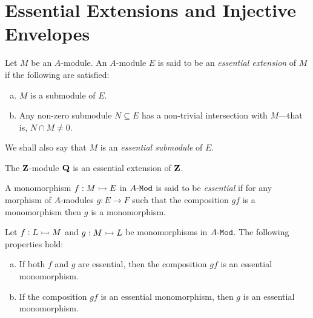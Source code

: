 \section{Essential Extensions and Injective Envelopes}

\begin{definition}
\label{def:essential-extension}
Let \(M\) be an \(A\)-module. An \(A\)-module \(E\) is said to be an
\emph{essential extension} of \(M\) if the following are satisfied:
\begin{enumerate}[(a)]\setlength\itemsep{0em}
\item \(M\) is a submodule of \(E\).
\item Any non-zero submodule \(N \subseteq E\) has a non-trivial intersection with
  \(M\)---that is, \(N \cap M \neq 0\).
\end{enumerate}
We shall also say that \(M\) is an \emph{essential submodule} of \(E\).
\end{definition}

\begin{example}
\label{exp:Q-is-essential-extension-of-Z}
The \(\mathbf{Z}\)-module \(\mathbf{Q}\) is an essential extension of \(\mathbf{Z}\).
\end{example}

\begin{definition}
\label{def:essential-monomorphism}
A monomorphism \(f: M \rightarrowtail E\) in \({A\text{-}\texttt{Mod}}\) is said to be \emph{essential} if
for any morphism of \(A\)-modules \(g: E \to F\) such that the composition
\(g f\) is a monomorphism then \(g\) is a monomorphism.
\end{definition}

\begin{lemma}
\label{lem:essential-monomorphism-and-compositions-properties}
Let \(f: L \rightarrowtail M\) and \(g: M \rightarrowtail L\) be monomorphisms in \({A\text{-}\texttt{Mod}}\). The
following properties hold:
\begin{enumerate}[(a)]\setlength\itemsep{0em}
\item If both \(f\) and \(g\) are essential, then the composition \(g f\) is an
  essential monomorphism.

\item If the composition \(g f\) is an essential monomorphism, then \(g\) is an
  essential monomorphism.
\end{enumerate}
\end{lemma}

